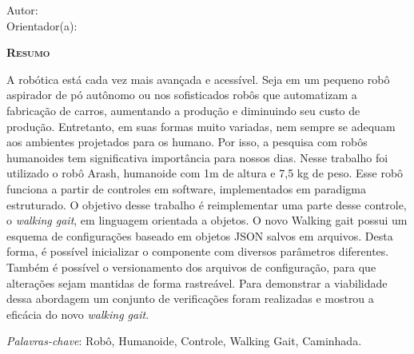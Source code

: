 \begin{center}
	{\Large{\textbf{\writedocumenttitle}}}
\end{center}

\vspace{1cm}

\begin{flushright}
	Autor: \writeauthor \\
	Orientador(a): \writeteacher
\end{flushright}

\vspace{1cm}

\begin{center}
	\Large{\textsc{\textbf{Resumo}}}
\end{center}

\noindent A robótica está cada vez mais avançada e acessível. Seja em um pequeno robô aspirador de pó autônomo ou nos sofisticados robôs que automatizam a fabricação de carros, aumentando a produção e diminuindo seu custo de produção. Entretanto, em suas formas muito variadas, nem sempre se adequam aos ambientes projetados para os humano. Por isso, a pesquisa com robôs humanoides tem significativa importância para nossos dias. Nesse trabalho foi utilizado o robô Arash, humanoide com 1m de altura e 7,5 kg de peso. Esse robô funciona a partir de controles em software, implementados em paradigma estruturado. O objetivo desse trabalho é reimplementar uma parte desse controle, o \textit{walking gait}, em linguagem orientada a objetos. O novo Walking gait possui um esquema de configurações baseado em objetos JSON salvos em arquivos. Desta forma, é possível inicializar o componente com diversos parâmetros diferentes. Também é possível o versionamento dos arquivos de configuração, para que alterações sejam mantidas de forma rastreável. Para demonstrar a viabilidade dessa abordagem um conjunto de verificações foram realizadas e mostrou a eficácia do novo \textit{walking gait}.
 
\noindent\textit{Palavras-chave}: Robô, Humanoide, Controle, Walking Gait, Caminhada.
